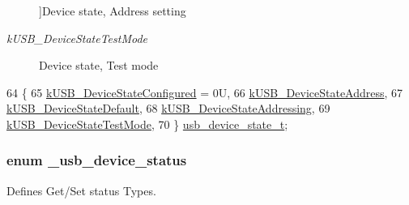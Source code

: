 \begin{Desc}
\begin{description}
{}]Device state, Address setting \item[{\em 
\hypertarget{group__usb__device__driver_gga6c3587990ca428244271f14efc909522ab7ff5567abb58aa097fd8af77df16a8c}{k\-U\-S\-B\-\_\-\-Device\-State\-Test\-Mode}\label{group__usb__device__driver_gga6c3587990ca428244271f14efc909522ab7ff5567abb58aa097fd8af77df16a8c}
}]Device state, Test mode \end{description}
\end{Desc}

\begin{DoxyCode}
64 \{
65     \hyperlink{group__usb__device__driver_gga6c3587990ca428244271f14efc909522a3cc5b3134e34ce6fc3d9c1ee0217e741}{kUSB\_DeviceStateConfigured} = 0U, 
66     \hyperlink{group__usb__device__driver_gga6c3587990ca428244271f14efc909522ac0b38e07063e3b0f01a984671e7bc23b}{kUSB\_DeviceStateAddress},         
67     \hyperlink{group__usb__device__driver_gga6c3587990ca428244271f14efc909522a25d25f366cf27a445b19a92fd7d20698}{kUSB\_DeviceStateDefault},         
68     \hyperlink{group__usb__device__driver_gga6c3587990ca428244271f14efc909522a257337842d7b3299efbaa8e1218d6069}{kUSB\_DeviceStateAddressing},      
69     \hyperlink{group__usb__device__driver_gga6c3587990ca428244271f14efc909522ab7ff5567abb58aa097fd8af77df16a8c}{kUSB\_DeviceStateTestMode},        
70 \} \hyperlink{group__usb__device__driver_gadb6af69c6a5a2124b197210e41ed8256}{usb\_device\_state\_t};
\end{DoxyCode}
\hypertarget{group__usb__device__driver_gad091bd3169bf45debbe8b5aba78d6091}{
\subsubsection[{\-\_\-usb\-\_\-device\-\_\-status}]{\setlength{\rightskip}{0pt plus 5cm}enum {\bf \-\_\-usb\-\_\-device\-\_\-status}}}\label{group__usb__device__driver_gad091bd3169bf45debbe8b5aba78d6091}


Defines Get/\-Set status Types. 

